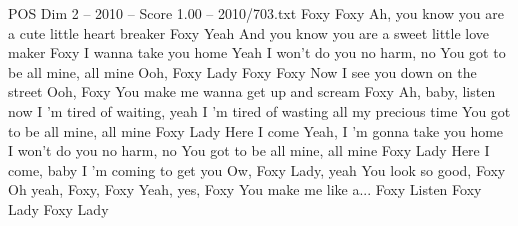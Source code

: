 \begin{textsample}{POS Dim 2 – 2010 – Score 1.00 – 2010/703.txt}  \label{ex:f2_pos_036}
Foxy Foxy Ah, you know you are a cute little heart breaker Foxy Yeah And you know you are a sweet little love maker Foxy I wanna take you home Yeah I won't do you no harm, no You got to be all mine, all mine Ooh, Foxy Lady Foxy Foxy Now I see you down on the street Ooh, Foxy You make me wanna get up and scream Foxy Ah, baby, listen now I 'm tired of waiting, yeah I 'm tired of wasting all my precious time You got to be all mine, all mine Foxy Lady Here I come Yeah, I 'm gonna take you home I won't do you no harm, no You got to be all mine, all mine Foxy Lady Here I come, baby I 'm coming to get you Ow, Foxy Lady, yeah You look so good, Foxy Oh yeah, Foxy, Foxy Yeah, yes, Foxy You make me like a...
Foxy Listen Foxy Lady Foxy Lady

\end{textsample}
